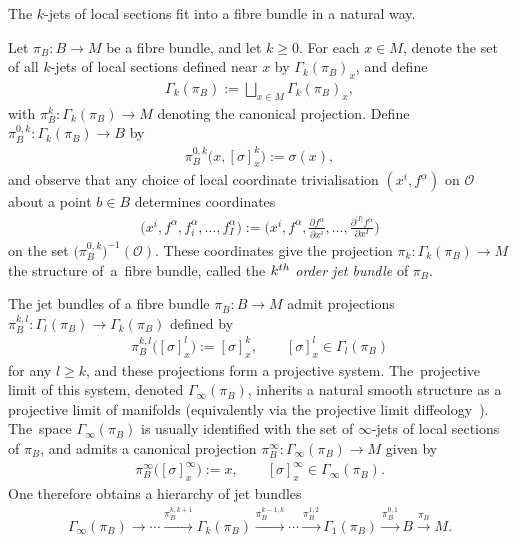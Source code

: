 \documentclass[11pt]{article}
\numberwithin{equation}{section}
\numberwithin{equation}{section}
\def\OO{{\mathcal{O}}}
\begin{document}
The $k$-jets of local sections fit into a fibre bundle in a natural way.

\begin{Definition}
Let $\pi_{B}\colon B\rightarrow M$ be a fibre bundle, and let $k\geq 0$. For each $x\in M$, denote the set of all $k$-jets of local sections defined near $x$ by $\Gamma_{k}(\pi_{B})_{x}$, and define
\begin{gather*}
\Gamma_{k}(\pi_{B}):=\bigsqcup_{x\in M}\Gamma_{k}(\pi_{B})_{x},
\end{gather*}
with $\pi_{B}^{k}\colon \Gamma_{k}(\pi_{B})\rightarrow M$ denoting the canonical projection. Define $\pi_{B}^{0,k}\colon \Gamma_{k}(\pi_{B})\rightarrow B$ by
\begin{gather*}
\pi_{B}^{0,k}\big(x,[\sigma]^{k}_{x}\big):=\sigma(x),
\end{gather*}
and observe that any choice of local coordinate trivialisation $(x^{i},f^{\alpha})$ on $\OO$ about a point $b\in B$ determines coordinates
\begin{gather*}%
\big(x^{i},f^{\alpha},f^{\alpha}_{i},\dots,f^{\alpha}_{I}\big):=\bigg(x^{i},f^{\alpha},\frac{\partial f^{\alpha}}{\partial x^{i}},\dots,\frac{\partial^{|I|}f^{\alpha}}{\partial x^{I}}\bigg)
\end{gather*}
on the set $\big(\pi^{0,k}_{B}\big)^{-1}(\OO)$. These coordinates give the projection $\pi_{k}\colon \Gamma_{k}(\pi_{B})\rightarrow M$ the structure of~a~fibre bundle, called the $k^{\rm th}$ \textit{order jet bundle} of $\pi_{B}$.
\end{Definition}

The jet bundles of a fibre bundle $\pi_{B}\colon B\rightarrow M$ admit projections $\pi_{B}^{k,l}\colon \Gamma_{l}(\pi_{B})\rightarrow \Gamma_{k}(\pi_{B})$ defined by
\begin{gather*}
\pi_{B}^{k,l}\big([\sigma]^{l}_{x}\big):=[\sigma]^{k}_{x},\qquad [\sigma]^{l}_{x}\in \Gamma_{l}(\pi_{B})
\end{gather*}
for any $l\geq k$, and these projections form a projective system. The~projective limit of this system, denoted $\Gamma_{\infty}(\pi_{B})$, inherits a natural smooth structure as a projective limit of manifolds \cite[Chapter One, Section A]{varbi} (equivalently via the projective limit diffeology~\cite[Section 1.39]{diffeology}). The~space $\Gamma_{\infty}(\pi_{B})$ is usually identified with the set of $\infty$-jets of local sections of $\pi_{B}$, and admits a canonical projection $\pi_{B}^{\infty}\colon \Gamma_{\infty}(\pi_{B})\rightarrow M$ given by
\begin{gather*}
\pi_{B}^{\infty}\big([\sigma]^{\infty}_{x}\big):=x,\qquad [\sigma]^{\infty}_{x}\in \Gamma_{\infty}(\pi_{B}).
\end{gather*}
One therefore obtains a hierarchy of jet bundles
\begin{gather*}
\Gamma_{\infty}(\pi_{B})\rightarrow\cdots\xrightarrow{\pi_{B}^{k,k+1}} \Gamma_{k}(\pi_{B})\xrightarrow{\pi_{B}^{k-1,k}}\cdots\xrightarrow{\pi_{B}^{1,2}} \Gamma_{1}(\pi_{B})\xrightarrow{\pi_{B}^{0,1}}B\xrightarrow{\pi_{B}}M.
\end{gather*}
\end{document}
